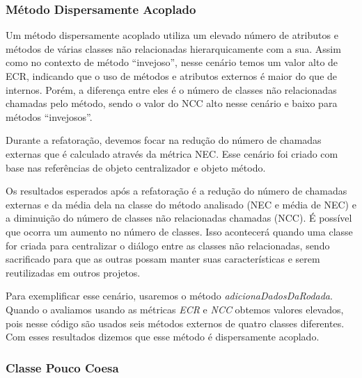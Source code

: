 	


\subsubsection{Método Dispersamente Acoplado}
	
	Um método dispersamente acoplado utiliza um elevado número de atributos e métodos de várias classes não relacionadas hierarquicamente com a sua. Assim como no contexto de método ``invejoso'', nesse cenário temos um valor alto de ECR, indicando que o uso de métodos e atributos externos é maior do que de internos. Porém, a diferença entre eles é o número de classes não relacionadas chamadas pelo método, sendo o valor do NCC alto nesse cenário e baixo para métodos ``invejosos''.
	
	Durante a refatoração, devemos focar na redução do número de chamadas externas que é calculado através da métrica NEC. Esse cenário foi criado com base nas referências de objeto centralizador e objeto método.
	
	Os resultados esperados após a refatoração é a redução do número de chamadas externas e da média dela na classe do método analisado (NEC e média de NEC) e a diminuição do número de classes não relacionadas chamadas (NCC). É possível que ocorra um aumento no número de classes. Isso acontecerá quando uma classe for criada para centralizar o diálogo entre as classes não relacionadas, sendo sacrificado para que as outras possam manter suas características e serem reutilizadas em outros projetos. 
	  
	Para exemplificar esse cenário, usaremos o método \textit{adicionaDadosDaRodada}. Quando o avaliamos usando as métricas \textit{ECR} e \textit{NCC} obtemos valores elevados, pois nesse código são usados seis métodos externos de quatro classes diferentes. Com esses resultados dizemos que esse método é dispersamente acoplado.
  
                                      
  

\subsubsection{Classe Pouco Coesa}

